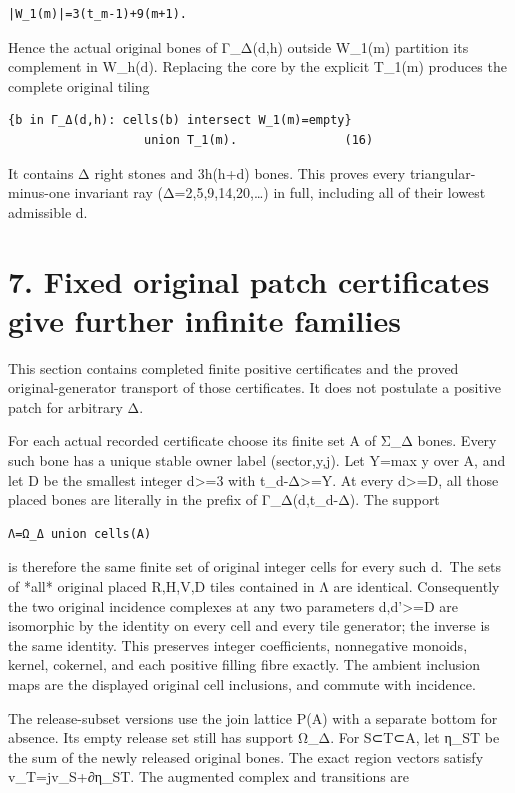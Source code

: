 \documentclass[
  10pt,
]{scrreprt}
\begin{document}
\begin{verbatim}
|W_1(m)|=3(t_m-1)+9(m+1).
\end{verbatim}

Hence the actual original bones of Γ\_Δ(d,h) outside W\_1(m) partition
its complement in W\_h(d). Replacing the core by the explicit T\_1(m)
produces the complete original tiling

\begin{verbatim}
{b in Γ_Δ(d,h): cells(b) intersect W_1(m)=empty}
                   union T_1(m).               (16)
\end{verbatim}

It contains Δ right stones and 3h(h+d) bones. This proves every
triangular-minus-one invariant ray (Δ=2,5,9,14,20,\ldots) in full,
including all of their lowest admissible d.

\section{7. Fixed original patch certificates give further infinite
families}\label{edition-10-section-14}

This section contains completed finite positive certificates and the
proved original-generator transport of those certificates. It does not
postulate a positive patch for arbitrary Δ.

For each actual recorded certificate choose its finite set A of Σ\_Δ
bones. Every such bone has a unique stable owner label (sector,y,j). Let
Y=max y over A, and let D be the smallest integer d\textgreater=3 with
t\_d-Δ\textgreater=Y. At every d\textgreater=D, all those placed bones
are literally in the prefix of Γ\_Δ(d,t\_d-Δ). The support

\begin{verbatim}
Λ=Ω_Δ union cells(A)
\end{verbatim}

is therefore the same finite set of original integer cells for every
such d.~The sets of *all* original placed R,H,V,D tiles contained in Λ
are identical. Consequently the two original incidence complexes at any
two parameters d,d'\textgreater=D are isomorphic by the identity on
every cell and every tile generator; the inverse is the same identity.
This preserves integer coefficients, nonnegative monoids, kernel,
cokernel, and each positive filling fibre exactly. The ambient inclusion
maps are the displayed original cell inclusions, and commute with
incidence.

The release-subset versions use the join lattice P(A) with a separate
bottom for absence. Its empty release set still has support Ω\_Δ. For
S⊂T⊂A, let η\_ST be the sum of the newly released original bones. The
exact region vectors satisfy v\_T=jv\_S+∂η\_ST. The augmented complex
and transitions are
\end{document}
